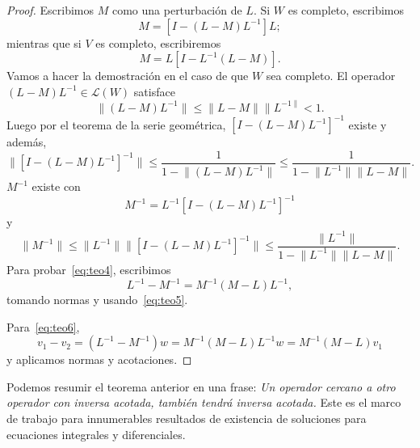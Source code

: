 \begin{proof}
	Escribimos $M$ como una perturbación de $L$. Si $W$ es completo, escribimos
	\begin{equation}
		M = [I - (L - M)L^{-1}]L;
	\end{equation}
	mientras que si $V$ es completo, escribiremos
	\begin{equation}
		M = L[I - L^{-1}(L - M)].
	\end{equation}
	Vamos a hacer la demostración en el caso de que $W$ sea completo.
	El operador $(L-M)L^{-1} \in \mathcal{L}(W)$ satisface
	\begin{equation}
		\lVert (L - M)L^{-1} \rVert \leqslant \lVert L - M \rVert \lVert L^{-1 \rVert} < 1.
	\end{equation}
	Luego por el teorema de la serie geométrica, $[I-(L-M)L^{-1}]^{-1}$ existe y además,
	\begin{equation}
		\lVert [I-(L-M)L^{-1}]^{-1} \rVert \leqslant \dfrac{1}{1 - \lVert (L-M)L^{-1}\rVert} \leqslant \dfrac{1}{1 - \lVert L^{-1} \rVert \lVert L-M \rVert }.
	\end{equation}
	$M^{-1}$ existe con
	\begin{equation}
		M^{-1} = L^{-1}[I-(L-M)L^{-1}]^{-1}
	\end{equation}
	y
	\begin{equation}
		\lVert M^{-1} \rVert \leqslant \lVert L^{-1} \rVert \lVert [I-(L-M)L^{-1}]^{-1} \rVert \leqslant \dfrac{\lVert L^{-1} \rVert}{1 - \lVert L^{-1} \rVert \lVert L-M \rVert}.
	\end{equation}
	Para probar~\eqref{eq:teo4}, escribimos
	\begin{equation}
		L^{-1} - M^{-1} = M^{-1}(M-L)L^{-1},
	\end{equation}
	tomando normas y usando~\eqref{eq:teo5}.
	
	Para~\eqref{eq:teo6},
	\begin{equation}
		v_1 - v_2 = (L^{-1} - M^{-1})w = M^{-1}(M-L)L^{-1}w = M^{-1}(M-L)v_1
	\end{equation}
	y aplicamos normas y acotaciones.
\end{proof}
Podemos resumir el teorema anterior en una frase: \textit{Un operador cercano a otro operador con inversa acotada, también tendrá inversa acotada.} Este es el marco de trabajo para innumerables resultados de existencia de soluciones para ecuaciones integrales y diferenciales.

